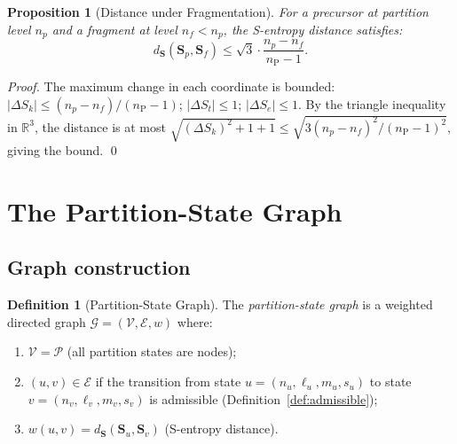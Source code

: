 \documentclass[twocolumn,10pt,a4paper]{article}
\theoremstyle{thmstyle}
\newtheorem{proposition}[theorem]{Proposition}
\theoremstyle{definition}
\newtheorem{definition}[theorem]{Definition}
\theoremstyle{remark}
\newcommand{\R}{\mathbb{R}}
\newcommand{\Parts}{\mathcal{P}}
\newcommand{\Sv}{\mathbf{S}}
\newcommand{\Sk}{S_{k}}
\newcommand{\St}{S_{t}}
\newcommand{\Se}{S_{e}}
\newcommand{\calG}{\mathcal{G}}
\newcommand{\calV}{\mathcal{V}}
\newcommand{\calE}{\mathcal{E}}
\newcommand{\nP}{n_{\mathrm{P}}}
\begin{document}
\begin{proposition}[Distance under Fragmentation]
\label{prop:frag-distance}
For a precursor at partition level $n_p$ and a fragment at level $n_f <
n_p$, the S-entropy distance satisfies:
\begin{equation}
d_{\Sv}(\Sv_p, \Sv_f) \leq \sqrt{3} \cdot \frac{n_p - n_f}{\nP - 1}.
\label{eq:frag-bound}
\end{equation}
\end{proposition}

\begin{proof}
The maximum change in each coordinate is bounded: $|\Delta\Sk| \leq
(n_p - n_f)/(\nP - 1)$; $|\Delta\St| \leq 1$; $|\Delta\Se| \leq 1$.
By the triangle inequality in $\R^3$, the distance is at most
$\sqrt{(\Delta\Sk)^2 + 1 + 1} \leq \sqrt{3(n_p-n_f)^2/(\nP-1)^2}$,
giving the bound. \qed
\end{proof}

\section{The Partition-State Graph}
\label{sec:graph}

\subsection{Graph construction}

\begin{definition}[Partition-State Graph]
\label{def:graph}
The \emph{partition-state graph} is a weighted directed graph
$\calG = (\calV, \calE, w)$ where:
\begin{enumerate}[nosep,label=(\roman*)]
\item $\calV = \Parts$ (all partition states are nodes);
\item $(u, v) \in \calE$ if the transition from state $u = (n_u,\ell_u,m_u,s_u)$
  to state $v = (n_v,\ell_v,m_v,s_v)$ is admissible
  (Definition~\ref{def:admissible});
\item $w(u,v) = d_{\Sv}(\Sv_u, \Sv_v)$ (S-entropy distance).
\end{enumerate}
\end{definition}
\end{document}

